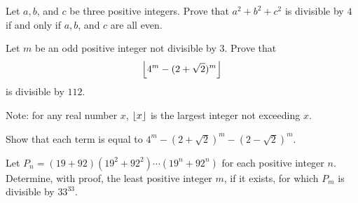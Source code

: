 \begin{problem}[Slovenia 2010]
	Let $a,b$, and $c$ be three positive integers. Prove that $a^2+b^2+c^2$ is divisible by $4$ if and only if $a,b$, and $c$ are all even. %
\end{problem}

%

\begin{problem}
	Let $m$ be an odd positive integer not divisible by $3$. Prove that
		\begin{align*}
			\left\lfloor{4^m -(2+\sqrt 2)^m}\right\rfloor
		\end{align*}
	is divisible by $112.$ %

	Note: for any real number $x$, $\left\lfloor{x}\right\rfloor$ is the largest integer not exceeding $x$.
\end{problem}

\begin{hint}
	Show that each term is equal to $4^m-(2+\sqrt 2)^m-(2-\sqrt 2)^m$.
\end{hint}

%

\begin{problem}
	Let $P_n = (19 + 92)(19^2 +92^2) \cdots(19^n +92^n)$ for each positive integer $n$. Determine, with proof, the least positive integer $m$, if it exists, for which $P_m$ is divisible by $33^{33}.$ %
\end{problem}


